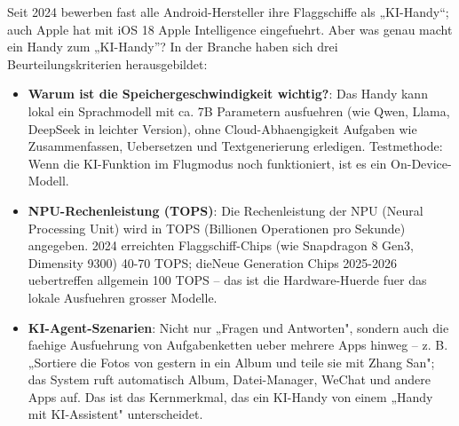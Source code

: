 


Seit 2024 bewerben fast alle Android-Hersteller ihre Flaggschiffe als „KI-Handy“; auch Apple hat mit iOS 18 Apple Intelligence eingefuehrt. Aber was genau macht ein Handy zum „KI-Handy”? In der Branche haben sich drei Beurteilungskriterien herausgebildet:

\begin{itemize}
  \item \textbf{Warum ist die Speichergeschwindigkeit wichtig?}: Das Handy kann lokal ein Sprachmodell mit ca. 7B Parametern ausfuehren (wie Qwen, Llama, DeepSeek in leichter Version), ohne Cloud-Abhaengigkeit Aufgaben wie Zusammenfassen, Uebersetzen und Textgenerierung erledigen. Testmethode: Wenn die KI-Funktion im Flugmodus noch funktioniert, ist es ein On-Device-Modell.
  \item \textbf{NPU-Rechenleistung (TOPS)}: Die Rechenleistung der NPU (Neural Processing Unit) wird in TOPS (Billionen Operationen pro Sekunde) angegeben. 2024 erreichten Flaggschiff-Chips (wie Snapdragon 8 Gen3, Dimensity 9300) 40-70 TOPS; dieNeue Generation Chips 2025-2026 uebertreffen allgemein 100 TOPS – das ist die Hardware-Huerde fuer das lokale Ausfuehren grosser Modelle.
  \item \textbf{KI-Agent-Szenarien}: Nicht nur „Fragen und Antworten", sondern auch die faehige Ausfuehrung von Aufgabenketten ueber mehrere Apps hinweg – z. B. „Sortiere die Fotos von gestern in ein Album und teile sie mit Zhang San"; das System ruft automatisch Album, Datei-Manager, WeChat und andere Apps auf. Das ist das Kernmerkmal, das ein KI-Handy von einem „Handy mit KI-Assistent" unterscheidet.
\end{itemize}

